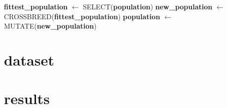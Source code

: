 \documentclass{article}
\begin{document}
\begin{algorithm}[h]
    \begin{algorithmic}[1]
        \State \textbf{fittest\_population} $\leftarrow$ SELECT(\textbf{population})
        \State \textbf{new\_population} $\leftarrow$ CROSSBREED(\textbf{fittest\_population})
       \State \textbf{population} $\leftarrow$ MUTATE(\textbf{new\_population})
       \EndFunction
\end{algorithmic}
\end{algorithm}
\section{dataset}

\section{results}
\end{document}
